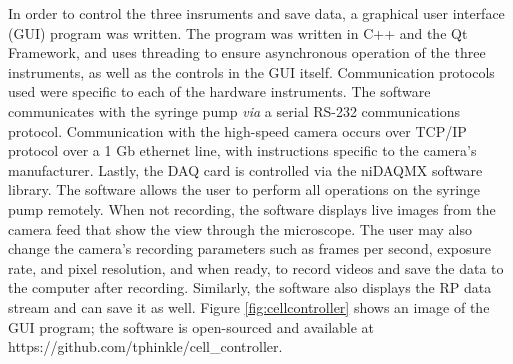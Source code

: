 			In order to control the three insruments and save data, a graphical user interface (GUI) program was written. The program was written in C++ and the Qt Framework, and uses threading to ensure asynchronous operation of the three instruments, as well as the controls in the GUI itself. Communication protocols used were specific to each of the hardware instruments. The software communicates with the syringe pump \textit{via} a serial RS-232 communications protocol. Communication with the high-speed camera occurs over TCP/IP protocol over a 1 Gb ethernet line, with instructions specific to the camera's manufacturer. Lastly, the DAQ card is controlled via the niDAQMX software library. The software allows the user to perform all operations on the syringe pump remotely. When not recording, the software displays live images from the camera feed that show the view through the microscope. The user may also change the camera's recording parameters such as frames per second, exposure rate, and pixel resolution, and when ready, to record videos and save the data to the computer after recording. Similarly, the software also displays the RP data stream and can save it as well. Figure \ref{fig:cellcontroller} shows an image of the GUI program; the software is open-sourced and available at https://github.com/tphinkle/cell\_controller.
			
